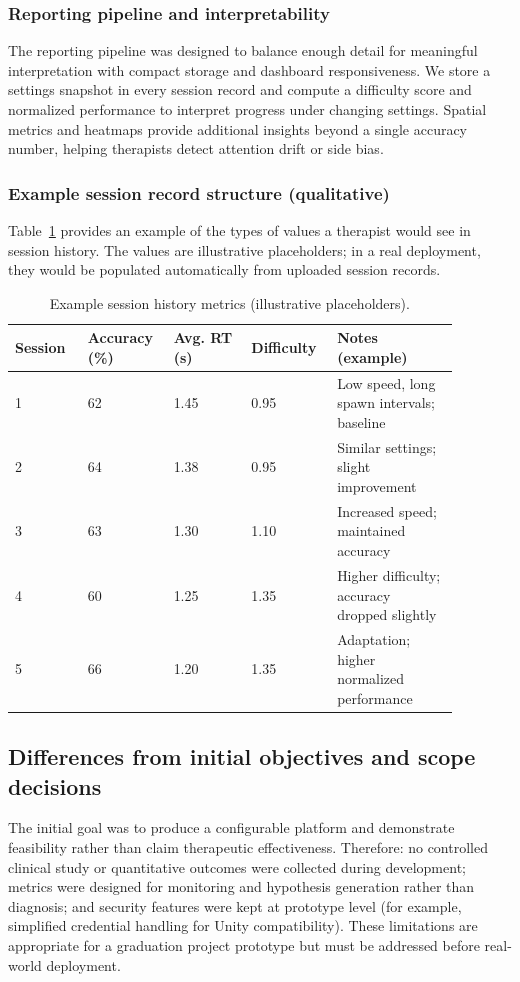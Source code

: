 \documentclass[12pt]{article}
\begin{document}
\subsubsection*{Reporting pipeline and interpretability}
The reporting pipeline was designed to balance enough detail for meaningful interpretation with compact storage and dashboard responsiveness. We store a settings snapshot in every session record and compute a difficulty score and normalized performance to interpret progress under changing settings. Spatial metrics and heatmaps provide additional insights beyond a single accuracy number, helping therapists detect attention drift or side bias.

\subsubsection*{Example session record structure (qualitative)}
Table~\ref{tab:example_metrics} provides an example of the types of values a therapist would see in session history. The values are illustrative placeholders; in a real deployment, they would be populated automatically from uploaded session records.

\begin{table}[H]
\centering
\caption{Example session history metrics (illustrative placeholders).}
\label{tab:example_metrics}
\begin{tabular}{p{0.15\linewidth} p{0.16\linewidth} p{0.16\linewidth} p{0.16\linewidth} p{0.25\linewidth}}
\toprule
\textbf{Session} & \textbf{Accuracy (\%)} & \textbf{Avg. RT (s)} & \textbf{Difficulty} & \textbf{Notes (example)} \\
\midrule
1 & 62 & 1.45 & 0.95 & Low speed, long spawn intervals; baseline \\
2 & 64 & 1.38 & 0.95 & Similar settings; slight improvement \\
3 & 63 & 1.30 & 1.10 & Increased speed; maintained accuracy \\
4 & 60 & 1.25 & 1.35 & Higher difficulty; accuracy dropped slightly \\
5 & 66 & 1.20 & 1.35 & Adaptation; higher normalized performance \\
\bottomrule
\end{tabular}
\end{table}

\subsection{Differences from initial objectives and scope decisions}
The initial goal was to produce a configurable platform and demonstrate feasibility rather than claim therapeutic effectiveness. Therefore:
no controlled clinical study or quantitative outcomes were collected during development; metrics were designed for monitoring and hypothesis generation rather than diagnosis; and security features were kept at prototype level (for example, simplified credential handling for Unity compatibility).
These limitations are appropriate for a graduation project prototype but must be addressed before real-world deployment.
\end{document}
